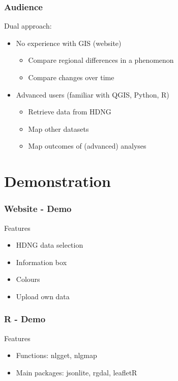 \documentclass{beamer}
\begin{document}
\begin{frame}
	\frametitle{Audience}
		Dual approach:
		\begin{itemize}
			\item No experience with GIS (website)
				\begin{itemize}
					\item Compare regional differences in a phenomenon
					\item Compare changes over time
				\end{itemize}
			\item Advanced users (familiar with QGIS, Python, R)
				\begin{itemize}
					\item Retrieve data from HDNG
					\item Map other datasets
					\item Map outcomes of (advanced) analyses
				\end{itemize}
		\end{itemize}
\end{frame}

\section{Demonstration}
\begin{frame}
	\frametitle{Website - Demo}
	Features
		\begin{itemize}
			\item HDNG data selection
			\item Information box
			\item Colours
			\item Upload own data
		\end{itemize}
\end{frame}

\begin{frame}
	\frametitle{R - Demo}
	Features
		\begin{itemize}
			\item Functions: nlgget, nlgmap
			\item Main packages: jsonlite, rgdal, leafletR
		\end{itemize}
\end{frame}
\end{document}
